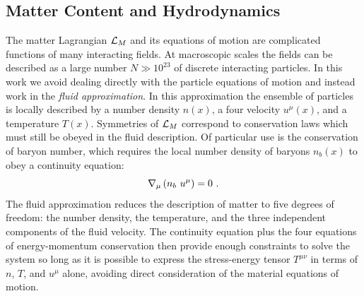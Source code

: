\subsection{Matter Content and Hydrodynamics}

   The matter Lagrangian $\mathcal{L}_M$ and its equations of motion are complicated functions of many interacting fields.  At macroscopic scales the fields can be described as a large number $N \gg 10^{23}$ of discrete interacting particles.  In this work we avoid dealing directly with the particle equations of motion and instead work in the \emph{fluid approximation}.    In this approximation the ensemble of particles is locally described by a number density $n(x)$, a four velocity $u^\mu(x)$, and a temperature $T(x)$.  Symmetries of $\mathcal{L}_M$ correspond to conservation laws which must still be obeyed in the fluid description.  Of particular use is the conservation of baryon number, which requires the local number density of baryons $n_b(x)$ to obey a continuity equation:
   \begin{equation}
   	\nabla_\mu \left(n_b\ u^\mu\right) = 0 \eqlabel{contnb}\ .
   \end{equation}
  The fluid approximation reduces the description of matter to five degrees of freedom: the number density, the temperature, and the three independent components of the fluid velocity.  The continuity equation  plus the four equations of energy-momentum conservation  then provide enough constraints to solve the system so long as it is possible to express the stress-energy tensor $T^{\mu\nu}$ in terms of $n$, $T$, and $u^\mu$ alone, avoiding direct consideration of the material equations of motion.
  
